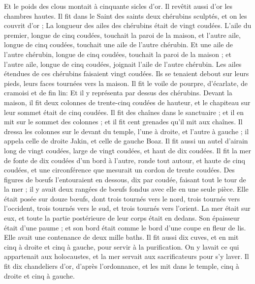 \begin{multicols}{2}
Et le poids des clous montait à cinquante sicles d'or. Il revêtit aussi d'or les chambres hautes.
Il fit dans le Saint des saints deux chérubins sculptés, et on les couvrit d'or ;
La longueur des ailes des chérubins était de vingt coudées. L'aile du premier, longue de cinq coudées, touchait la paroi de la maison, et l'autre aile, longue de cinq coudées, touchait une aile de l'autre chérubin.
Et une aile de l'autre chérubin, longue de cinq coudées, touchait la paroi de la maison ; et l'autre aile, longue de cinq coudées, joignait l'aile de l'autre chérubin.
Les ailes étendues de ces chérubins faisaient vingt coudées. Ils se tenaient debout sur leurs pieds, leurs faces tournées vers la maison.
Il fit le voile de pourpre, d'écarlate, de cramoisi et de fin lin: Et il y représenta par dessus des chérubins.
Devant la maison, il fit deux colonnes de trente-cinq coudées de hauteur, et le chapiteau sur leur sommet était de cinq coudées.
Il fit des chaînes dans le sanctuaire ; et il en mit sur le sommet des colonnes ; et il fit cent grenades qu'il mit aux chaînes.
Il dressa les colonnes sur le devant du temple, l'une à droite, et l'autre à gauche ; il appela celle de droite Jakin, et celle de gauche Boaz.
\VerseOne{}Il fit aussi un autel d'airain long de vingt coudées, large de vingt coudées, et haut de dix coudées.
Il fit la mer de fonte de dix coudées d'un bord à l'autre, ronde tout autour, et haute de cinq coudées, et une circonférence que mesurait un cordon de trente coudées.
Des figures de bœufs l'entouraient en dessous, dix par coudée, faisant tout le tour de la mer ; il y avait deux rangées de bœufs fondus avec elle en une seule pièce.
Elle était posée sur douze bœufs, dont trois tournés vers le nord, trois tournés vers l'occident, trois tournés vers le sud, et trois tournés vers l'orient. La mer était sur eux, et toute la partie postérieure de leur corps était en dedans.
Son épaisseur était d'une paume ; et son bord était comme le bord d'une coupe en fleur de lis. Elle avait une contenance de deux mille baths.
Il fit aussi dix cuves, et en mit cinq à droite et cinq à gauche, pour servir à la purification. On y lavait ce qui appartenait aux holocaustes, et la mer servait aux sacrificateurs pour s'y laver.
Il fit dix chandeliers d'or, d'après l'ordonnance, et les mit dans le temple, cinq à droite et cinq à gauche.

\end{multicols}
